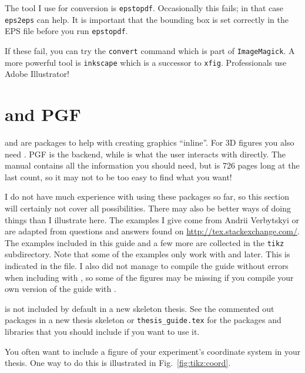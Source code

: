 The tool I use for conversion is \texttt{epstopdf}. Occasionally this
fails; in that case \texttt{eps2eps} can help. It is important that
the bounding box is set correctly in the EPS file before you run
\texttt{epstopdf}.

If these fail, you can try the \texttt{convert} command which is part
of \texttt{ImageMagick}. A more powerful tool is \texttt{inkscape}
which is a successor to \texttt{xfig}. Professionals use Adobe Illustrator!


\section{\TikZ and PGF}
\label{sec:fig:tikz}

 and  are packages to help with
creating graphics \enquote{inline}. For 3D figures you also need
. PGF is the backend, while \TikZ is what the
user interacts with directly. The manual contains all the information
you should need, but is 726 pages long at the last count, so it may
not to be too easy to find what you want!

I do not have much experience with using these packages so far, so
this section will certainly not cover all possibilities. There may
also be better ways of doing things than I illustrate here. The
examples I give come from Andrii Verbytskyi or are adapted from
questions and answers found on
\url{http://tex.stackexchange.com/}. The examples included in this
guide and a few more are collected in the \texttt{tikz}
subdirectory. Note that some of the examples only work with  and later. This is indicated in the file. I also did not manage
to compile the guide without errors when including  with
, so some of the figures may be missing if you compile
your own version of the guide with .

\TikZ is not included by default in a new skeleton thesis. See the
commented out packages in a new thesis skeleton or
\texttt{thesis\_guide.tex} for the packages and \TikZ libraries that
you should include if you want to use it.

You often want to include a figure of your experiment's coordinate
system in your thesis. One way to do this is illustrated in
Fig.~\ref{fig:tikz:coord}.

